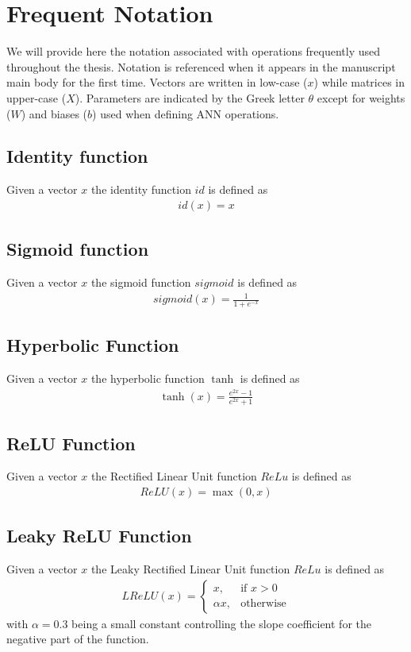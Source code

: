\chapter{Frequent Notation}

We will provide here the notation associated with operations frequently used throughout the thesis. Notation is referenced when it appears in the manuscript main body for the first time. Vectors are written in low-case ($x$) while matrices in upper-case ($X$). Parameters are indicated by the Greek letter $\theta$ except for weights ($W$) and biases ($b$) used when defining ANN operations.

\section{Identity function}
Given a vector $x$ the identity function $id$ is defined as 
\begin{gather}
    \label{identity}
    id(x) = x
\end{gather}

\section{Sigmoid function}
Given a vector $x$ the sigmoid function $sigmoid$ is defined as 
\begin{gather}
    \label{sigmoid}
    sigmoid(x) = \frac {1} {1 + e^{-x}}
\end{gather}

\section{Hyperbolic Function}
Given a vector $x$ the hyperbolic function $\tanh$ is defined as 
\begin{gather}
    \label{tanh}
    \tanh(x) = \frac {e^{2x} -1} {e^{2x} +1}
\end{gather}

\section{ReLU Function}
Given a vector $x$ the Rectified Linear Unit function $ReLu$ is defined as 
\begin{gather}
    \label{relu}
    ReLU(x) = \max(0, x)
\end{gather}

\section{Leaky ReLU Function}
Given a vector $x$ the Leaky Rectified Linear Unit function $ReLu$ is defined as 
\begin{gather}
    \label{lelu}
    LReLU(x) =
    \begin{cases}
        x,& \text{if } x > 0 \\
        \alpha x,              & \text{otherwise}
    \end{cases}
\end{gather}
with $\alpha=0.3$ being a small constant controlling the slope coefficient for the negative part of the function.

